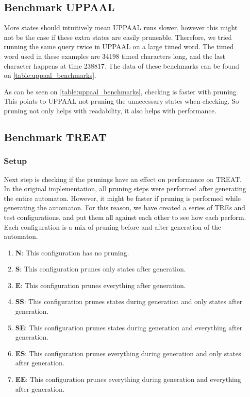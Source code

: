 \subsection{Benchmark UPPAAL}\label{sub:benchmark_uppaal}
More states should intuitively mean UPPAAL runs slower, however this might not be the case if these extra states are easily pruneable.
Therefore, we tried running the same query twice in UPPAAL on a large timed word.
The timed word used in these examples are 34198 timed characters long, and the last character happens at time 238817.
The data of these benchmarks can be found on \cref{table:uppaal_benchmarks}.



As can be seen on \cref{table:uppaal_benchmarks}, checking is faster with pruning.
This points to UPPAAL not pruning the unnecessary states when checking.
So pruning not only helps with readability, it also helps with performance.

\subsection{Benchmark TREAT}
\subsubsection{Setup}
Next step is checking if the prunings have an effect on performance on TREAT.
In the original implementation, all pruning steps were performed after generating the entire automaton.
However, it might be faster if pruning is performed while generating the automaton.
For this reason, we have created a series of TREs and test configurations, and put them all against each other to see how each perform.
Each configuration is a mix of pruning before and after generation of the automaton.

\begin{enumerate}
    \item \textbf{N}: This configuration has no pruning.
    \item \textbf{S}: This configuration prunes only states after generation.
    \item \textbf{E}: This configuration prunes everything after generation.
    \item \textbf{SS}: This configuration prunes states during generation and only states after generation.
    \item \textbf{SE}: This configuration prunes states during generation and everything after generation.
    \item \textbf{ES}: This configuration prunes everything during generation and only states after generation.
    \item \textbf{EE}: This configuration prunes everything during generation and everything after generation.
\end{enumerate}

